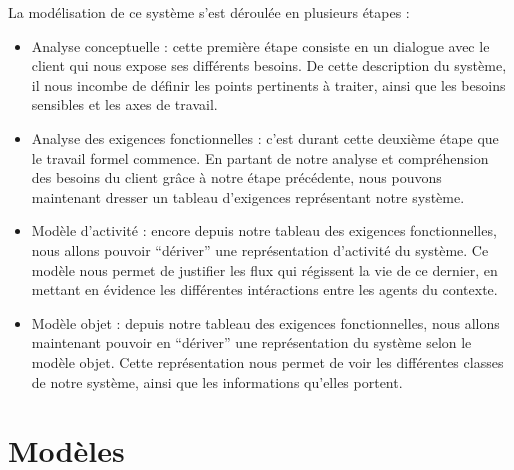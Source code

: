 \documentclass[12pt,a4paper]{article}
\begin{document}
La modélisation de ce système s'est déroulée en plusieurs étapes :
\begin{itemize}
        \item Analyse conceptuelle : cette première étape consiste en un
            dialogue avec le client qui nous expose ses différents besoins. De
            cette description du système, il nous incombe de définir les points
            pertinents à traiter, ainsi que les besoins sensibles et les axes de
            travail.
        \item Analyse des exigences fonctionnelles : c'est durant cette deuxième
            étape que le travail formel commence. En partant de notre
            analyse et compréhension des besoins du client grâce à notre étape
            précédente, nous pouvons maintenant dresser un tableau d'exigences
            représentant notre système.
        \item Modèle d'activité : encore depuis notre tableau des exigences
            fonctionnelles, nous allons pouvoir \enquote{dériver} une
            représentation d'activité du système. Ce modèle nous permet de
            justifier les flux qui régissent la vie de ce dernier, en mettant en
            évidence les différentes intéractions entre les agents du contexte.
        \item Modèle objet : depuis notre tableau des exigences fonctionnelles,
            nous allons maintenant pouvoir en \enquote{dériver} une
            représentation du système selon le modèle objet. Cette
            représentation nous permet de voir les différentes classes de
            notre système, ainsi que les informations qu'elles portent.
\end{itemize}

\section{Modèles}
\end{document}
